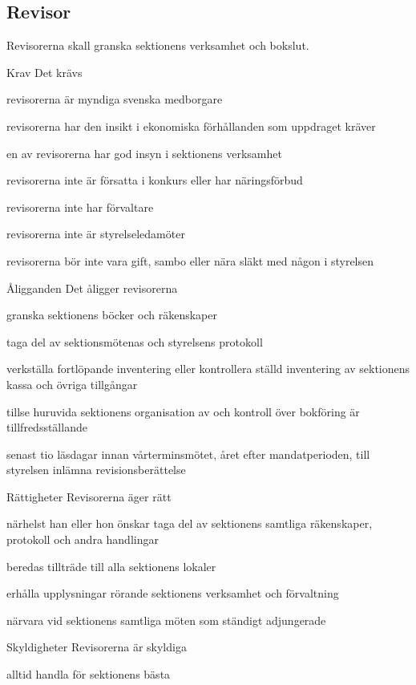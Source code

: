 \documentclass[pdfbookmarks,a4paper,11pt]{article}
\newcommand{\funktionar}[1]{%
  \subsection*{#1}\par
  \addcontentsline{toc}{subsection}{#1}}
\newlength{\itemcollength}
\newenvironment{reglemlista}{%
  \begin{list}{}{%
      \setlength{\labelwidth}{\itemcollength}%
      \setlength{\leftmargin}{\labelwidth + \labelsep}%
      \renewcommand{\makelabel}[1]{%
        \raisebox{0pt}[1ex][0pt]{%
          \makebox[\labelwidth][l]{%
            \parbox[t]{\itemcollength}{%
              \raggedright\hspace{0pt}##1}}}\hfill}%
      }}{%
  \end{list}}
\begin{document}
\funktionar{Revisor}
Revisorerna skall granska sektionens verksamhet och bokslut.

\begin{reglemlista}

	\item[Krav]
	Det krävs
	\begin{attlista}
		\item revisorerna är myndiga svenska medborgare
		\item revisorerna har den insikt i ekonomiska förhållanden som uppdraget kräver
		\item en av revisorerna har god insyn i sektionens verksamhet
		\item revisorerna inte är försatta i konkurs eller har näringsförbud
		\item revisorerna inte har förvaltare
		\item revisorerna inte är styrelseledamöter
		\item revisorerna bör inte vara gift, sambo eller nära släkt med någon i styrelsen
	\end{attlista}

	\item[Åligganden]
	Det åligger revisorerna
	\begin{attlista}
		\item granska sektionens böcker och räkenskaper
		\item taga del av sektionsmötenas och styrelsens protokoll
		\item verkställa fortlöpande inventering eller kontrollera ställd inventering av sektionens kassa och övriga tillgångar
		\item tillse huruvida sektionens organisation av och kontroll över bokföring är tillfredsställande
		\item senast tio läsdagar innan vårterminsmötet, året
		efter mandatperioden, till styrelsen inlämna revisionsberättelse
	\end{attlista}

	\item[Rättigheter]
	Revisorerna äger rätt
	\begin{attlista}
		\item närhelst han eller hon önskar taga del av sektionens samtliga räkenskaper, protokoll och andra handlingar
		\item beredas tillträde till alla sektionens lokaler
		\item erhålla upplysningar rörande sektionens verksamhet och förvaltning
		\item närvara vid sektionens samtliga möten som ständigt adjungerade
	\end{attlista}

	\item[Skyldigheter]
	Revisorerna är skyldiga
	\begin{attlista}
		\item alltid handla för sektionens bästa
	\end{attlista}

\end{reglemlista}
\end{document}

